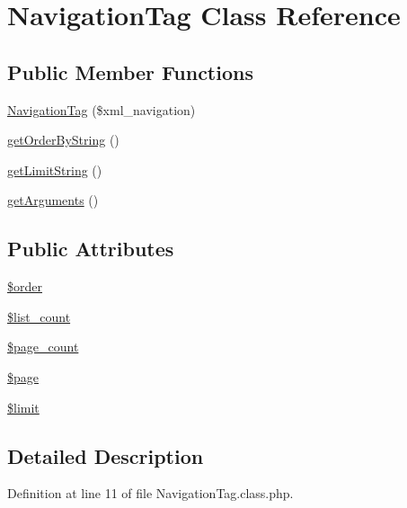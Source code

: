 \hypertarget{classNavigationTag}{\section{Navigation\-Tag Class Reference}
\label{classNavigationTag}
}
\subsection*{Public Member Functions}
\begin{DoxyCompactItemize}
\item 
\hyperlink{classNavigationTag_a91495b131102c08b0e926ec2df903c1f}{Navigation\-Tag} (\$xml\-\_\-navigation)
\item 
\hyperlink{classNavigationTag_a5d0ad196e149753b1adb58a1883f369d}{get\-Order\-By\-String} ()
\item 
\hyperlink{classNavigationTag_a9adb174f58ed2ef92137970d0a7b2c81}{get\-Limit\-String} ()
\item 
\hyperlink{classNavigationTag_a05afcf00355b39311b716e35e68789a6}{get\-Arguments} ()
\end{DoxyCompactItemize}
\subsection*{Public Attributes}
\begin{DoxyCompactItemize}
\item 
\hyperlink{classNavigationTag_a67fea0de20a4e7bf16df396c69171799}{\$order}
\item 
\hyperlink{classNavigationTag_a0d79757d75c3a0cfc3d38db7346349a4}{\$list\-\_\-count}
\item 
\hyperlink{classNavigationTag_a1aaaffcb475c1edc0a93539c59a92ce9}{\$page\-\_\-count}
\item 
\hyperlink{classNavigationTag_a095ee63f01c7ae4c6e66854521c88371}{\$page}
\item 
\hyperlink{classNavigationTag_a322d95f82cadac06f257815e2bcc28a3}{\$limit}
\end{DoxyCompactItemize}


\subsection{Detailed Description}


Definition at line 11 of file Navigation\-Tag.\-class.\-php.



